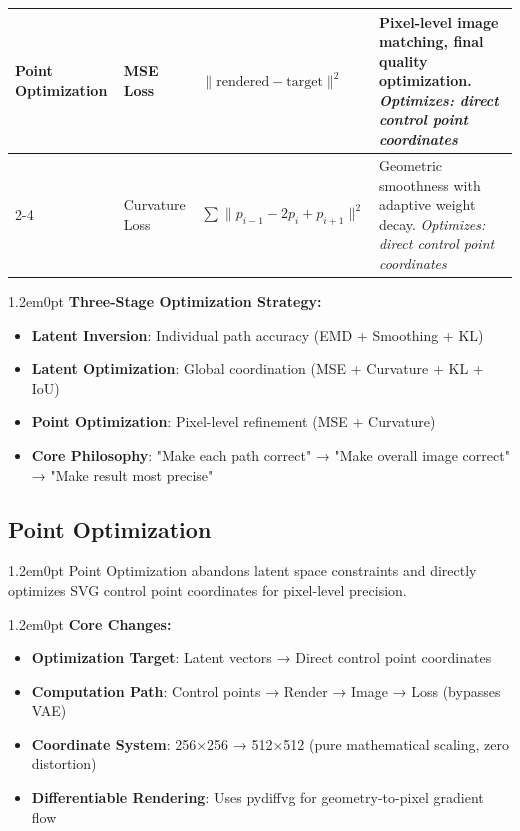\documentclass[10pt,a4paper]{article}
\newenvironment{bodytext}{\begin{adjustwidth}{1.2em}{0pt}}{\end{adjustwidth}}
\begin{document}
\begin{center}
\begin{longtable}{|p{3.5cm}|p{3cm}|p{3cm}|p{5.5cm}|}
\multirow{2}{*}{\textbf{Point Optimization}} & MSE Loss & $\|\text{rendered} - \text{target}\|^2$ & Pixel-level image matching, final quality optimization. \textit{Optimizes: direct control point coordinates} \\
\cline{2-4}
& Curvature Loss & $\sum \|p_{i-1} - 2p_i + p_{i+1}\|^2$ & Geometric smoothness with adaptive weight decay. \textit{Optimizes: direct control point coordinates} \\
\hline

\end{longtable}
\end{center}

\begin{bodytext}
\textbf{Three-Stage Optimization Strategy:}
\begin{itemize}
\item \textbf{Latent Inversion}: Individual path accuracy (EMD + Smoothing + KL)
\item \textbf{Latent Optimization}: Global coordination (MSE + Curvature + KL + IoU)
\item \textbf{Point Optimization}: Pixel-level refinement (MSE + Curvature)
\item \textbf{Core Philosophy}: "Make each path correct" → "Make overall image correct" → "Make result most precise"
\end{itemize}
\end{bodytext}

\subsection{Point Optimization}

\begin{bodytext}
Point Optimization abandons latent space constraints and directly optimizes SVG control point coordinates for pixel-level precision.
\end{bodytext}

\begin{bodytext}
\textbf{Core Changes:}
\begin{itemize}
\item \textbf{Optimization Target}: Latent vectors → Direct control point coordinates
\item \textbf{Computation Path}: Control points → Render → Image → Loss (bypasses VAE)
\item \textbf{Coordinate System}: 256×256 → 512×512 (pure mathematical scaling, zero distortion)
\item \textbf{Differentiable Rendering}: Uses pydiffvg for geometry-to-pixel gradient flow
\end{itemize}
\end{bodytext}
\end{document}
